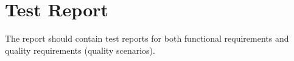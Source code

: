 \chapter{Test Report}

The report should contain test reports for both functional requirements and quality requirements (quality scenarios).